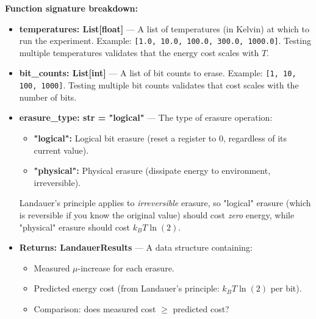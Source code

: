 \textbf{Function signature breakdown:}
\begin{itemize}
    \item \textbf{temperatures: List[float]} — A list of temperatures (in Kelvin) at which to run the experiment. Example: \texttt{[1.0, 10.0, 100.0, 300.0, 1000.0]}. Testing multiple temperatures validates that the energy cost scales with $T$.
    
    \item \textbf{bit\_counts: List[int]} — A list of bit counts to erase. Example: \texttt{[1, 10, 100, 1000]}. Testing multiple bit counts validates that cost scales with the number of bits.
    
    \item \textbf{erasure\_type: str = "logical"} — The type of erasure operation:
    \begin{itemize}
        \item \textbf{"logical":} Logical bit erasure (reset a register to 0, regardless of its current value).
        \item \textbf{"physical":} Physical erasure (dissipate energy to environment, irreversible).
    \end{itemize}
    Landauer's principle applies to \textit{irreversible} erasure, so "logical" erasure (which is reversible if you know the original value) should cost \textit{zero} energy, while "physical" erasure should cost $k_B T \ln(2)$.
    
    \item \textbf{Returns: LandauerResults} — A data structure containing:
    \begin{itemize}
        \item Measured $\mu$-increase for each erasure.
        \item Predicted energy cost (from Landauer's principle: $k_B T \ln(2)$ per bit).
        \item Comparison: does measured cost $\geq$ predicted cost?
    \end{itemize}
\end{itemize}

